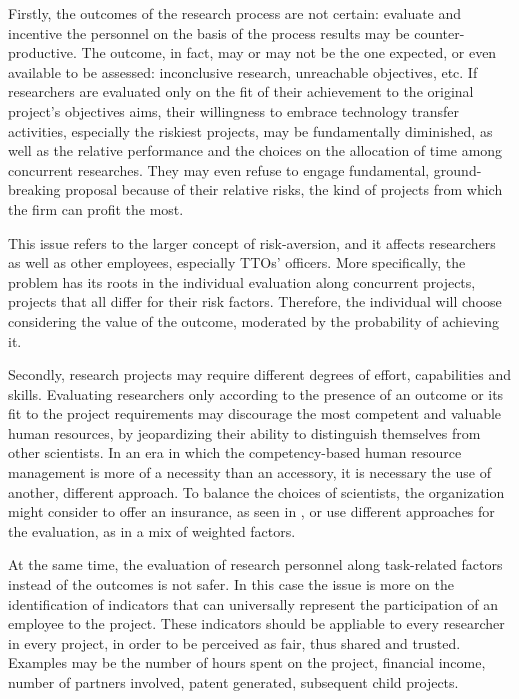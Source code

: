 Firstly, the outcomes of the research process are not certain: evaluate and incentive the personnel on the basis of the process results may be counter-productive. The outcome, in fact, may or may not be the one expected, or even available to be assessed: inconclusive research, unreachable objectives, etc. If researchers are evaluated only on the fit of their achievement to the original project's objectives aims, their willingness to embrace technology transfer activities, especially the riskiest projects, may be fundamentally diminished, as well as the relative performance and the choices on the allocation of time among concurrent researches. They may even refuse to engage fundamental, ground-breaking proposal because of their relative risks, the kind of projects from which the firm can profit the most. 

This issue refers to the larger concept of risk-aversion, and it affects researchers as well as other employees, especially TTOs' officers. More specifically, the problem has its roots in the individual evaluation along concurrent projects, projects that all differ for their risk factors. Therefore, the individual will choose considering the value of the outcome, moderated by the probability of achieving it. 

Secondly, research projects may require different degrees of effort, capabilities and skills. Evaluating researchers only according to the presence of an outcome or its fit to the project requirements may discourage the most competent and valuable human resources, by jeopardizing their ability to distinguish themselves from other scientists. In an era in which the competency-based human resource management is more of a necessity than an accessory, it is necessary the use of another, different approach. To balance the choices of scientists, the organization might consider to offer an insurance, as seen in \citet{Panagopoulos2013}, or use different approaches for the evaluation, as in a mix of weighted factors.

At the same time, the evaluation of research personnel along task-related factors instead of the outcomes is not safer. In this case the issue is more on the identification of indicators that can universally represent the participation of an employee to the project. These indicators should be appliable to every researcher in every project, in order to be perceived as fair, thus shared and trusted. Examples may be the number of hours spent on the project, financial income, number of partners involved, patent generated, subsequent child projects. 

